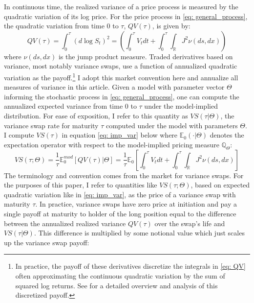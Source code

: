 \documentclass[12pt]{article}
\begin{document}
In continuous time, the realized variance of a price process is measured by the quadratic variation of its log price. For the price process in \eqref{eq: general_process}, the quadratic variation from time 0 to $\tau$, $QV(\tau)$, is given by:
\begin{equation}\label{eq: QV}
 QV(\tau) = \int_0^{\tau} \left(d\log S_t\right)^2 =   \left(\int_0^{\tau}  V_t d t + \int_0^{\tau}  \int_{\mathbb{R}} J^2 \nu(d s, d x)\right)
\end{equation}
where $\nu(d s, d x)$ is the jump product measure. Traded derivatives based on variance, most notably variance swaps, use a function of annualized quadratic variation as the payoff.\footnote{In practice, the payoff of these derivatives discretize the integrals in \eqref{eq: QV} often approximating the continuous quadratic variation by the sum of squared log returns. See \cite{bondarenko2014variance} for a detailed overview and analysis of this discretized payoff. } I adopt this market convention here and annualize all measures of variance in this article. Given a model with parameter vector $\Theta$ informing the stochastic process in \eqref{eq: general_process}, one can compute the annualized expected variance from time $0$ to $\tau$ under the model-implied distribution. For ease of exposition, I refer to this quantity as $VS(\tau\vert \Theta)$, the variance swap rate for maturity $\tau$ computed under the model with parameters $\Theta$. I compute $VS(\tau)$ in equation \eqref{eq: imp_var} below where $\mathbb{E}_0(\cdot\vert \Theta)$ denotes the expectation operator with respect to the model-implied pricing measure $\mathbb{Q}_\Theta$:
\begin{equation}\label{eq: imp_var}
 VS(\tau; \Theta) = \dfrac{1}{\tau}  \mathbb{E}_0^{mod}\left[QV(\tau) \vert \Theta\right] = \dfrac{1}{\tau} \mathbb{E}_0\left[\int_0^{\tau} V_t  d t + \int_0^{\tau} \int_{\mathbb{R}} J^2 \nu(d s, d x)\right]
\end{equation}
The terminology and convention comes from the market for variance swaps. For the purposes of this paper, I refer to quantities like $VS(\tau; \Theta)$, based on expected quadratic variation like in \eqref{eq: imp_var}, as the price of a variance swap with maturity $\tau$. In practice, variance swaps have zero price at initiation and pay a single payoff at maturity to holder of the long position equal to the difference between the annualized realized variance $QV(\tau)$ over the swap's life and $VS(\tau\vert \Theta)$. This difference is multiplied by some notional value which just scales up the variance swap payoff:
\end{document}
